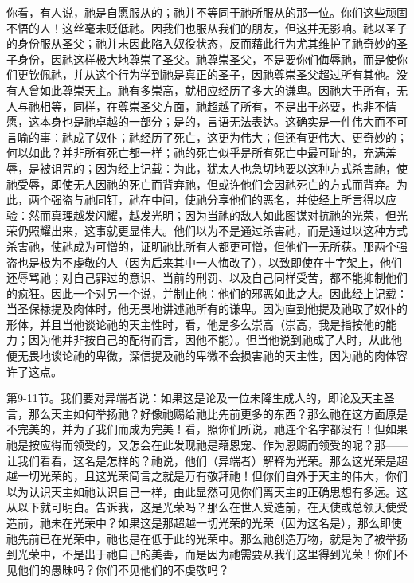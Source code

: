 你看，有人说，祂是自愿服从的；祂并不等同于祂所服从的那一位。你们这些顽固不悟的人！这丝毫未贬低祂。因我们也服从我们的朋友，但这并无影响。祂以圣子的身份服从圣父；祂并未因此陷入奴役状态，反而藉此行为尤其维护了祂奇妙的圣子身份，因祂这样极大地尊崇了圣父。祂尊崇圣父，不是要你们侮辱祂，而是使你们更钦佩祂，并从这个行为学到祂是真正的圣子，因祂尊崇圣父超过所有其他。没有人曾如此尊崇天主。祂有多崇高，就相应经历了多大的谦卑。因祂大于所有，无人与祂相等，同样，在尊崇圣父方面，祂超越了所有，不是出于必要，也非不情愿，这本身也是祂卓越的一部分；是的，言语无法表达。这确实是一件伟大而不可言喻的事：祂成了奴仆；祂经历了死亡，这更为伟大；但还有更伟大、更奇妙的；何以如此？并非所有死亡都一样；祂的死亡似乎是所有死亡中最可耻的，充满羞辱，是被诅咒的；因为经上记载：为此，犹太人也急切地要以这种方式杀害祂，使祂受辱，即使无人因祂的死亡而背弃祂，但或许他们会因祂死亡的方式而背弃。为此，两个强盗与祂同钉，祂在中间，使祂分享他们的恶名，并使经上所言得以应验：然而真理越发闪耀，越发光明；因为当祂的敌人如此图谋对抗祂的光荣，但光荣仍照耀出来，这事就更显伟大。他们以为不是通过杀害祂，而是通过以这种方式杀害祂，使祂成为可憎的，证明祂比所有人都更可憎，但他们一无所获。那两个强盗也是极为不虔敬的人（因为后来其中一人悔改了），以致即使在十字架上，他们还辱骂祂；对自己罪过的意识、当前的刑罚、以及自己同样受苦，都不能抑制他们的疯狂。因此一个对另一个说，并制止他：他们的邪恶如此之大。因此经上记载：当圣保禄提及肉体时，他无畏地讲述祂所有的谦卑。因为直到他提及祂取了奴仆的形体，并且当他谈论祂的天主性时，看，他是多么崇高（崇高，我是指按他的能力；因为他并非按自己的配得而言，因他不能）。但当他说到祂成了人时，从此他便无畏地谈论祂的卑微，深信提及祂的卑微不会损害祂的天主性，因为祂的肉体容许了这点。\par

第9-11节。我们要对异端者说：如果这是论及一位未降生成人的，即论及天主圣言，那么天主如何举扬祂？好像祂赐给祂比先前更多的东西？那么祂在这方面原是不完美的，并为了我们而成为完美！看，照你们所说，祂连个名字都没有！但如果祂是按应得而领受的，又怎会在此发现祂是藉恩宠、作为恩赐而领受的呢？那——让我们看看，这名是怎样的？祂说，他们（异端者）解释为光荣。那么这光荣是超越一切光荣的，且这光荣简言之就是万有敬拜祂！但你们自外于天主的伟大，你们以为认识天主如祂认识自己一样，由此显然可见你们离天主的正确思想有多远。这从以下就可明白。告诉我，这是光荣吗？那么在世人受造前，在天使或总领天使受造前，祂未在光荣中？如果这是那超越一切光荣的光荣（因为这名是），那么即使祂先前已在光荣中，祂也是在低于此的光荣中。那么祂创造万物，就是为了被举扬到光荣中，不是出于祂自己的美善，而是因为祂需要从我们这里得到光荣！你们不见他们的愚昧吗？你们不见他们的不虔敬吗？\par

